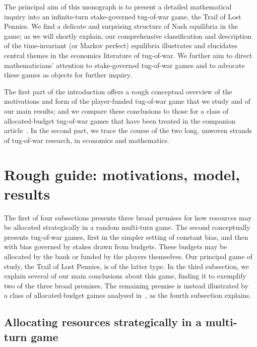 \documentclass[letterpaper,11pt,oneside,reqno]{amsbook}
\numberwithin{figure}{chapter}
\theoremstyle{definition}
\theoremstyle{definition}
\theoremstyle{definition}
\theoremstyle{definition}
\theoremstyle{definition}
\begin{document}
The principal aim of this monograph is to present a detailed mathematical inquiry into an infinite-turn stake-governed tug-of-war game, the Trail of Lost Pennies. We find a delicate and surprising structure of Nash equilibria in the game; as we will shortly explain, our comprehensive classification and description of the time-invariant (or Markov perfect) equilibria illustrates and elucidates central themes in the economics literature of tug-of-war. 
 We further aim to direct mathematicians' attention to stake-governed tug-of-war games and to advocate these games  as objects for further inquiry.




The first part of the introduction offers a rough conceptual overview of the motivations and form of the player-funded tug-of-war game that we study and of our main results; and we compare these conclusions to those for a class of allocated-budget tug-of-war games that have been treated in the companion article~\cite{HP2022}. In the second part, we trace the course of the two long, unwoven strands of tug-of-war research, in economics and mathematics.




\section{Rough guide: motivations, model, results}

The first of four subsections presents three broad premises for how resources may be allocated strategically in a random multi-turn game. The second conceptually presents tug-of-war games, first in the simpler setting of constant bias, and then with bias governed by stakes drawn from budgets. These budgets may be allocated by the bank or funded by the players themselves. Our principal game of study, the Trail of Lost Pennies, is of the latter type. In the third subsection, we explain several of our main conclusions about this game, finding it to exemplify two of the three broad premises. The remaining premise is instead illustrated by a class of allocated-budget games analysed in~\cite{HP2022}, as the fourth subsection explains.  

\subsection{Allocating resources strategically in a multi-turn game}\label{s.allocate}
\end{document}
